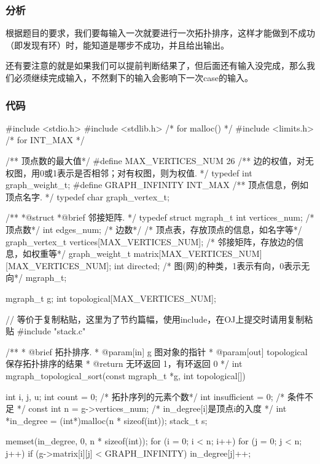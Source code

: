 \subsubsection{分析}
根据题目的要求，我们要每输入一次就要进行一次拓扑排序，这样才能做到不成功（即发现有环）时，能知道是哪步不成功，并且给出输出。

还有要注意的就是如果我们可以提前判断结果了，但后面还有输入没完成，那么我们必须继续完成输入，不然剩下的输入会影响下一次case的输入。

\subsubsection{代码}
\begin{Codex}[label=poj_1094.c]
#include <stdio.h>
#include <stdlib.h>  /* for malloc() */
#include <limits.h>  /* for INT_MAX */

/** 顶点数的最大值*/
#define MAX_VERTICES_NUM 26
/** 边的权值，对无权图，用0或1表示是否相邻；对有权图，则为权值. */
typedef int graph_weight_t;
#define GRAPH_INFINITY INT_MAX
/** 顶点信息，例如顶点名字. */
typedef char graph_vertex_t;

/**
 *@struct
 *@brief 邻接矩阵.
 */
typedef struct mgraph_t {
    int vertices_num; /* 顶点数*/
    int edges_num; /* 边数*/
    /* 顶点表，存放顶点的信息，如名字等*/
    graph_vertex_t vertices[MAX_VERTICES_NUM];
    /* 邻接矩阵，存放边的信息，如权重等*/
    graph_weight_t matrix[MAX_VERTICES_NUM][MAX_VERTICES_NUM];
    int directed; /* 图(网)的种类，1表示有向，0表示无向*/
} mgraph_t;

mgraph_t g;
int topological[MAX_VERTICES_NUM];

// 等价于复制粘贴，这里为了节约篇幅，使用include，在OJ上提交时请用复制粘贴
#include "stack.c"

/**
  * @brief 拓扑排序.
  * @param[in] g 图对象的指针
  * @param[out] topological 保存拓扑排序的结果
  * @return 无环返回 1，有环返回 0
  */
int mgraph_topological_sort(const mgraph_t *g, int topological[]) {
    int i, j, u;
    int count = 0; /* 拓扑序列的元素个数*/
    int insufficient = 0;  /* 条件不足 */
    const int n = g->vertices_num;
    /* in_degree[i]是顶点i的入度 */
    int *in_degree = (int*)malloc(n * sizeof(int));
    stack_t s;

    memset(in_degree, 0, n * sizeof(int));
    for (i = 0; i < n; i++) {
        for (j = 0; j < n; j++) {
            if (g->matrix[i][j] < GRAPH_INFINITY)
                in_degree[j]++;
        }
    }

}
\end{Codex}
